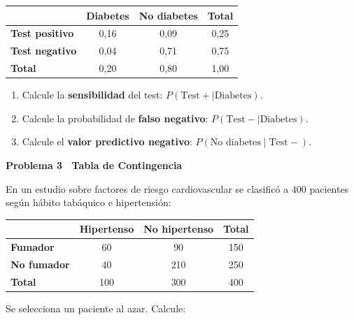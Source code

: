 \documentclass[10pt,letterpaper]{article}
\newcommand{\seccion}[1]{%
  \vspace{2pt}%
  \begin{tcolorbox}[enhanced,colback=white,colframe=black,arc=0pt,boxrule=0pt,
    leftrule=2pt,left=6pt,right=6pt,top=1pt,bottom=1pt]
    {\normalsize\bfseries\sffamily #1}
  \end{tcolorbox}%
  \vspace{1pt}%
}
\begin{document}
\vspace{4pt}
\begin{center}
\small\sffamily
\begin{tabular}{|l|c|c|c|}
\hline
 & \textbf{Diabetes} & \textbf{No diabetes} & \textbf{Total} \\
\hline
\textbf{Test positivo} & 0{,}16 & 0{,}09 & 0{,}25 \\
\hline
\textbf{Test negativo} & 0{,}04 & 0{,}71 & 0{,}75 \\
\hline
\textbf{Total} & 0{,}20 & 0{,}80 & 1{,}00 \\
\hline
\end{tabular}
\end{center}
\vspace{4pt}

\begin{enumerate}[leftmargin=1.2cm, label=\textbf{\alph*)}, itemsep=2pt, topsep=2pt]
  \item Calcule la \textbf{sensibilidad} del test: $P(\text{Test}+\mid\text{Diabetes})$.
  \item Calcule la probabilidad de \textbf{falso negativo}: $P(\text{Test}-\mid\text{Diabetes})$.
  \item Calcule el \textbf{valor predictivo negativo}: $P(\text{No diabetes}\mid\text{Test}-)$.
\end{enumerate}

\seccion{Problema 3 \textendash\ Tabla de Contingencia}

\noindent\sffamily\small En un estudio sobre factores de riesgo cardiovascular se clasific\'o a 400 pacientes seg\'un h\'abito tab\'aquico e hipertensi\'on:

\vspace{4pt}
\begin{center}
\small\sffamily
\begin{tabular}{|l|c|c|c|}
\hline
 & \textbf{Hipertenso} & \textbf{No hipertenso} & \textbf{Total} \\
\hline
\textbf{Fumador} & 60 & 90 & 150 \\
\hline
\textbf{No fumador} & 40 & 210 & 250 \\
\hline
\textbf{Total} & 100 & 300 & 400 \\
\hline
\end{tabular}
\end{center}
\vspace{4pt}

Se selecciona un paciente al azar. Calcule:
\end{document}
